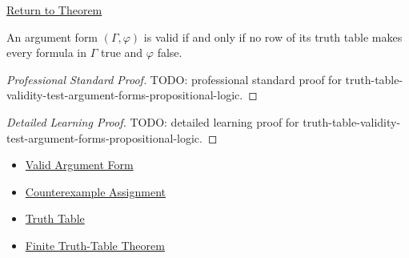 \newpage
{}
\label{prf:truth-table-validity-test-argument-forms-propositional-logic}

\begin{remark*}[Return]
\hyperref[thm:truth-table-validity-test-argument-forms-propositional-logic]{Return to Theorem}
\end{remark*}

\begin{theorem*}
An argument form \((\Gamma,\varphi)\) is valid if and only if no row of its truth
table makes every formula in \(\Gamma\) true and \(\varphi\) false.
\end{theorem*}

\begin{proof}[Professional Standard Proof]
\LRAProofBodyStart
TODO: professional standard proof for truth-table-validity-test-argument-forms-propositional-logic.
\end{proof}

\begin{proof}[Detailed Learning Proof]
\LRAProofBodyStart
TODO: detailed learning proof for truth-table-validity-test-argument-forms-propositional-logic.
\end{proof}

\begin{remark*}
\end{remark*}

\begin{dependencies}
\begin{itemize}
  \item \hyperref[def:valid-argument-form-propositional-logic]{Valid Argument Form}
  \item \hyperref[def:counterexample-assignment-propositional-logic]{Counterexample Assignment}
  \item \hyperref[def:truth-table-propositional-logic]{Truth Table}
  \item \hyperref[thm:finite-truth-table-propositional-logic]{Finite Truth-Table Theorem}
\end{itemize}
\end{dependencies}

\clearpage
